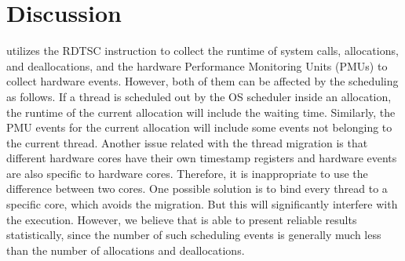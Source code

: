 \section{Discussion}

\label{sec:limitation}

\MP{} utilizes the RDTSC instruction to collect the runtime of system calls, allocations, and deallocations, and the hardware Performance Monitoring Units (PMUs) to collect hardware events. However, both of them can be affected by the scheduling as follows. If a thread is scheduled out by the OS scheduler inside an allocation, the runtime of the current allocation will include the waiting time. Similarly, the PMU events for the current allocation will  include some events not belonging to the current thread. Another issue related with the thread migration is that different hardware cores have their own timestamp registers and hardware events are also specific to hardware cores. Therefore, it is inappropriate to use the difference between two cores.  One possible solution is to bind every thread to a specific core, which avoids the migration. But this will significantly interfere with the execution. However, we believe that \MP{} is able to present reliable results statistically, since the number of such scheduling events is generally much less than the number of allocations and deallocations.   

